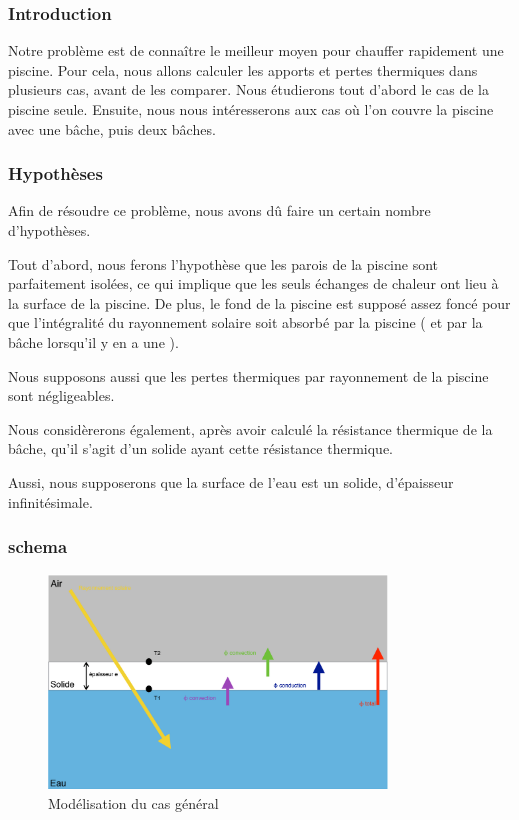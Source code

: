 \documentclass{beamer}
\begin{document}
  \begin{frame}
    \frametitle{Introduction}
    Notre problème est de connaître le meilleur moyen pour chauffer rapidement une piscine. Pour cela, nous allons calculer les apports et pertes thermiques dans plusieurs cas, avant de les comparer. Nous étudierons tout d’abord le cas de la piscine seule. Ensuite, nous nous intéresserons aux cas où l’on couvre la piscine avec une bâche, puis deux bâches.
  \end{frame}
  \begin{frame}
   \frametitle{Hypothèses}
   	Afin de résoudre ce problème, nous avons dû faire un certain nombre d’hypothèses. 

Tout d’abord, nous ferons l’hypothèse que les parois de la piscine sont parfaitement isolées, ce qui implique que les seuls échanges de chaleur ont lieu à la surface de la piscine. De plus, le fond de la piscine est supposé assez foncé pour que l’intégralité du rayonnement solaire soit absorbé par la piscine ( et par la bâche lorsqu’il y en a une ).

Nous supposons aussi que les pertes thermiques par rayonnement de la piscine sont négligeables.

Nous considèrerons également, après avoir calculé la résistance thermique de la bâche, qu’il s’agit d’un solide ayant cette résistance thermique. 

Aussi, nous supposerons que la surface de l’eau est un solide, d’épaisseur infinitésimale.
  \end{frame}
  \begin{frame}
   \frametitle{schema}
   \begin{figure}[ht!]
    \centering
    \includegraphics[width=90mm]{thermo.png}
    \caption{Mod\'{e}lisation du cas g\'{e}n\'{e}ral \label{overflow}}
   \end{figure}
  \end{frame}
\end{document}
